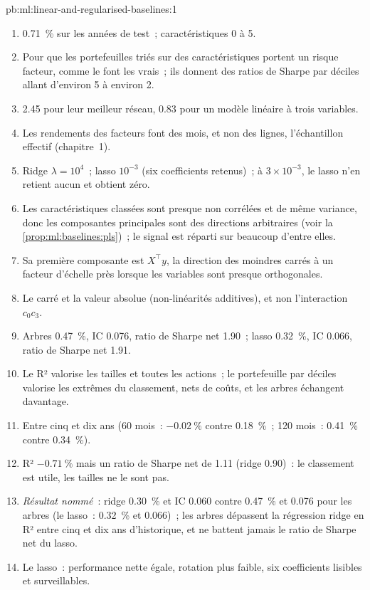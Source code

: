 \begin{solution}{pb:ml:linear-and-regularised-baselines:1}
\begin{enumerate}
\item 0.71~\% sur les années de test~; caractéristiques 0 à 5.
\item Pour que les portefeuilles triés sur des caractéristiques portent un risque facteur, comme le font les vrais~; ils donnent des ratios de Sharpe par déciles
allant d'environ 5 à environ 2.
\item 2.45 pour leur meilleur réseau, 0.83 pour un modèle linéaire à trois variables.
\item Les rendements des facteurs font des mois, et non des lignes, l'échantillon effectif (chapitre~1).
\item Ridge $\lambda = 10^4$~; lasso $10^{-3}$ (six coefficients retenus)~; à $3\times10^{-3}$, le lasso n'en retient aucun et obtient
zéro.
\item Les caractéristiques classées sont presque non corrélées et de même variance, donc les composantes principales sont des directions arbitraires
(voir la \cref{prop:ml:baselines:pls})~; le signal est réparti sur beaucoup d'entre elles.
\item Sa première composante est $X^\top y$, la direction des moindres carrés à un facteur d'échelle près lorsque les variables sont presque orthogonales.
\item Le carré et la valeur absolue (non-linéarités additives), et non l'interaction $c_0c_3$.
\item Arbres 0.47~\%, IC 0.076, ratio de Sharpe net 1.90~; lasso 0.32~\%, IC 0.066, ratio de Sharpe net 1.91.
\item Le R² valorise les tailles et toutes les actions~; le portefeuille par déciles valorise les extrêmes du classement, nets de coûts, et les
arbres échangent davantage.
\item Entre cinq et dix ans (60 mois~: $-0.02~\%$ contre 0.18~\%~; 120 mois~: 0.41~\% contre 0.34~\%).
\item R² $-0.71~\%$ mais un ratio de Sharpe net de 1.11 (ridge 0.90)~: le classement est utile, les tailles ne le sont pas.
\item \emph{Résultat nommé}~: ridge 0.30~\% et IC 0.060 contre 0.47~\% et 0.076 pour les arbres (le lasso~: 0.32~\% et 0.066)~;
les arbres dépassent la régression ridge en R² entre cinq et dix ans d'historique, et ne battent jamais le
ratio de Sharpe net du lasso.
\item Le lasso~: performance nette égale, rotation plus faible, six coefficients lisibles et surveillables.

\end{enumerate}
\end{solution}

